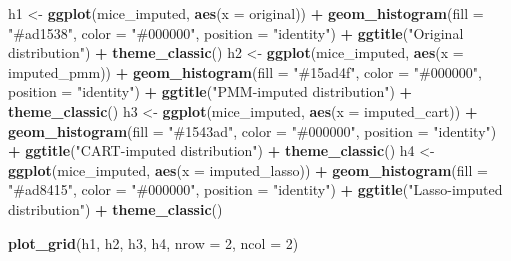 \documentclass[
]{article}
\newenvironment{Shaded}{\begin{snugshade}}{\end{snugshade}}
\newcommand{\AttributeTok}[1]{\textcolor[rgb]{0.13,0.29,0.53}{#1}}
\newcommand{\DecValTok}[1]{\textcolor[rgb]{0.00,0.00,0.81}{#1}}
\newcommand{\FunctionTok}[1]{\textcolor[rgb]{0.13,0.29,0.53}{\textbf{#1}}}
\newcommand{\NormalTok}[1]{#1}
\newcommand{\OtherTok}[1]{\textcolor[rgb]{0.56,0.35,0.01}{#1}}
\newcommand{\SpecialCharTok}[1]{\textcolor[rgb]{0.81,0.36,0.00}{\textbf{#1}}}
\newcommand{\StringTok}[1]{\textcolor[rgb]{0.31,0.60,0.02}{#1}}
\begin{document}
\begin{Shaded}
\begin{Highlighting}[]
\NormalTok{h1 }\OtherTok{\textless{}{-}} \FunctionTok{ggplot}\NormalTok{(mice\_imputed, }\FunctionTok{aes}\NormalTok{(}\AttributeTok{x =}\NormalTok{ original)) }\SpecialCharTok{+}
  \FunctionTok{geom\_histogram}\NormalTok{(}\AttributeTok{fill =} \StringTok{"\#ad1538"}\NormalTok{, }\AttributeTok{color =} \StringTok{"\#000000"}\NormalTok{, }\AttributeTok{position =} \StringTok{"identity"}\NormalTok{) }\SpecialCharTok{+}
  \FunctionTok{ggtitle}\NormalTok{(}\StringTok{"Original distribution"}\NormalTok{) }\SpecialCharTok{+}
  \FunctionTok{theme\_classic}\NormalTok{()}
\NormalTok{h2 }\OtherTok{\textless{}{-}} \FunctionTok{ggplot}\NormalTok{(mice\_imputed, }\FunctionTok{aes}\NormalTok{(}\AttributeTok{x =}\NormalTok{ imputed\_pmm)) }\SpecialCharTok{+}
  \FunctionTok{geom\_histogram}\NormalTok{(}\AttributeTok{fill =} \StringTok{"\#15ad4f"}\NormalTok{, }\AttributeTok{color =} \StringTok{"\#000000"}\NormalTok{, }\AttributeTok{position =} \StringTok{"identity"}\NormalTok{) }\SpecialCharTok{+}
  \FunctionTok{ggtitle}\NormalTok{(}\StringTok{"PMM{-}imputed distribution"}\NormalTok{) }\SpecialCharTok{+}
  \FunctionTok{theme\_classic}\NormalTok{()}
\NormalTok{h3 }\OtherTok{\textless{}{-}} \FunctionTok{ggplot}\NormalTok{(mice\_imputed, }\FunctionTok{aes}\NormalTok{(}\AttributeTok{x =}\NormalTok{  imputed\_cart)) }\SpecialCharTok{+}
  \FunctionTok{geom\_histogram}\NormalTok{(}\AttributeTok{fill =} \StringTok{"\#1543ad"}\NormalTok{, }\AttributeTok{color =} \StringTok{"\#000000"}\NormalTok{, }\AttributeTok{position =} \StringTok{"identity"}\NormalTok{) }\SpecialCharTok{+}
  \FunctionTok{ggtitle}\NormalTok{(}\StringTok{"CART{-}imputed distribution"}\NormalTok{) }\SpecialCharTok{+}
  \FunctionTok{theme\_classic}\NormalTok{()}
\NormalTok{h4 }\OtherTok{\textless{}{-}} \FunctionTok{ggplot}\NormalTok{(mice\_imputed, }\FunctionTok{aes}\NormalTok{(}\AttributeTok{x =}\NormalTok{ imputed\_lasso)) }\SpecialCharTok{+}
  \FunctionTok{geom\_histogram}\NormalTok{(}\AttributeTok{fill =} \StringTok{"\#ad8415"}\NormalTok{, }\AttributeTok{color =} \StringTok{"\#000000"}\NormalTok{, }\AttributeTok{position =} \StringTok{"identity"}\NormalTok{) }\SpecialCharTok{+}
  \FunctionTok{ggtitle}\NormalTok{(}\StringTok{"Lasso{-}imputed distribution"}\NormalTok{) }\SpecialCharTok{+}
  \FunctionTok{theme\_classic}\NormalTok{()}

\FunctionTok{plot\_grid}\NormalTok{(h1, h2, h3, h4, }\AttributeTok{nrow =} \DecValTok{2}\NormalTok{, }\AttributeTok{ncol =} \DecValTok{2}\NormalTok{)}
\end{Highlighting}
\end{Shaded}
\end{document}
